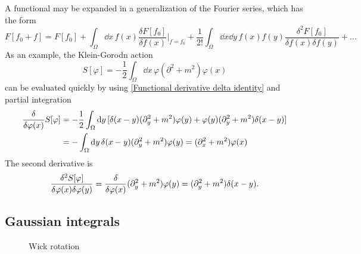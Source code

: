 A functional may be expanded in a generalization of the Fourier series, which has the form
\begin{equation}
    F[f_0 + f] = F[f_0] + \int_\Omega \dd x \, f(x) \frac{\delta F[f_0]}{\delta f(x)}\bigg|_{f = f_0}
    + \frac{1}{2!}\int_\Omega \dd x \dd y \, f(x) f(y) \frac{\delta^2 F [f_0]}{\delta f(x) \delta f(y)}
    + \dots
\end{equation}
As an example, the Klein-Gorodn action
\begin{equation}
    S[\varphi] = - \frac{1}{2}\int_\Omega \dd x \, \varphi (\partial^2 + m^2) \varphi(x)
\end{equation}
can be evaluated quickly by using \autoref{Functional derivative delta identity} and partial integration
\begin{align}
    \nonumber
    \frac{\delta }{\delta \varphi(x)} S[\varphi] 
    & = 
    - \frac{1}{2} \int_\Omega \dd y \, 
    [\delta(x - y)(\partial_y^2 + m^2)\varphi(y) + \varphi(y) (\partial_y^2 + m^2)\delta(x - y)] \\
    & = 
    - \int_\Omega \dd y \, 
    \delta(x - y)(\partial_y^2 + m^2)\varphi(y) 
    = (\partial_x^2 + m^2)\varphi(x)
\end{align}
The second derivative is
\begin{equation}
    \frac{\delta^2S[\varphi]}{\delta \varphi(x)\delta \varphi(y)}
    =
    \frac{\delta }{\delta \varphi(x)} (\partial_y^2 + m^2)\varphi(y)
    = 
    (\partial_y^2 + m^2) \delta(x - y).
\end{equation}


\subsection*{Gaussian integrals}
\label{section:gaussian integrals}

\begin{figure}[ht]
    \centering
    \caption{Wick rotation}
    \label{Wick rotation}
\end{figure}


